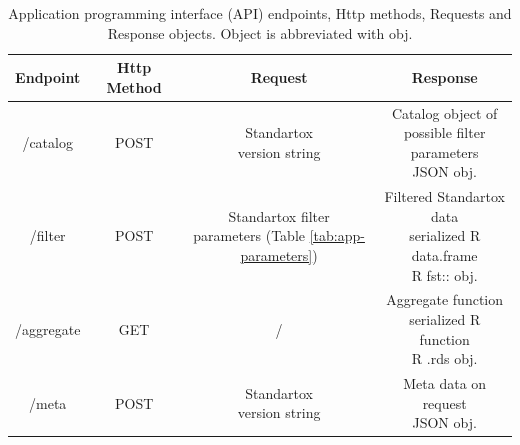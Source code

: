 \documentclass[journal,datadescriptor,accept,moreauthors,pdftex]{Definitions/mdpi}
\begin{document}
\begin{table}[H]
    \caption{Application programming interface (API) endpoints, Http methods,
    Requests and Response objects. Object is abbreviated with obj.}
    \label{tab:api-endpoints}
    \centering
\begin{tabular}{cccc}
    \toprule
    \textbf{Endpoint} & \textbf{Http Method} & \textbf{Request} & \textbf{Response} \\ 
    \midrule
    /catalog & POST & \makecell{Standartox \\ version string} & \makecell{Catalog object of \\ possible filter parameters \\ JSON obj.}    \\[0.5cm]
    /filter & POST & \makecell{Standartox filter \\ parameters (Table \ref{tab:app-parameters})} & \makecell{Filtered Standartox data \\ serialized R data.frame \\ R fst:: \citep{klik_fst_2019} obj.}   \\[0.5cm]
    /aggregate & GET & / & \makecell{Aggregate function \\ serialized R function \\ R .rds \citep{rcoreteam_language_2017} obj.}    \\[0.5cm]
    /meta & POST & \makecell{Standartox \\ version string} & \makecell{Meta data on request \\ JSON obj.}    \\
    \bottomrule
\end{tabular}
\end{table}

\section{}
\end{document}
